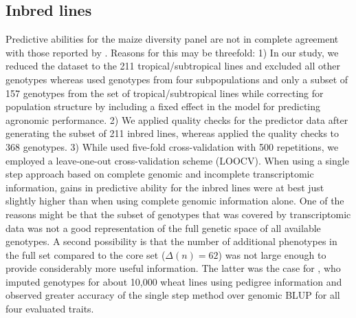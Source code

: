 \documentclass[12pt,titlepage]{article}
\begin{document}
\subsection{Inbred lines}
Predictive abilities for the maize diversity panel are not in complete
agreement with those reported by .
Reasons for this may be threefold: 
1) In our study, we reduced the dataset to the 211 tropical/subtropical lines 
and excluded all other genotypes whereas  used genotypes from 
four subpopulations and only a subset of 157 genotypes from the set of 
tropical/subtropical lines while correcting for population structure by
including a fixed effect in the model for predicting agronomic performance.
2) We applied quality checks for the predictor data after generating the subset
of 211 inbred lines, whereas  applied the quality checks to 368
genotypes.
3) While  used five-fold cross-validation with 500 repetitions,
we employed a leave-one-out cross-validation scheme (LOOCV).
When using a single step approach based on complete genomic and incomplete
transcriptomic information, gains in predictive ability for the inbred lines
were at best just slightly higher than when using complete genomic information
alone.
One of the reasons might be that the subset of genotypes that was covered by
transcriptomic data was not a good representation of the full genetic space of
all available genotypes.
A second possibility is that the number of additional phenotypes in the full
set compared to the core set ($\Delta(n) = 62$) was not large enough to provide
considerably more useful information.
The latter was the case for , who imputed genotypes for about 
10,000 wheat lines using pedigree information and observed greater accuracy of
the single step method over genomic BLUP for all four evaluated traits.
\end{document}
